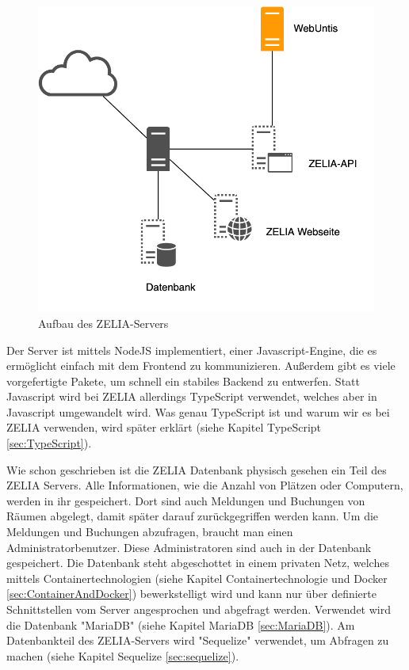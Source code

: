 \begin{figure}[H]
    \centering
    \includegraphics[width=120mm]{./media/Intro/server_arch.png}
    \caption{Aufbau des ZELIA-Servers}
\end{figure}

Der Server ist mittels NodeJS implementiert, einer Javascript-Engine, die es ermöglicht einfach mit dem Frontend zu kommunizieren. Außerdem gibt es viele vorgefertigte Pakete, um schnell ein stabiles Backend zu entwerfen. Statt Javascript wird bei ZELIA allerdings TypeScript verwendet, welches aber in Javascript umgewandelt wird. Was genau TypeScript ist und warum wir es bei ZELIA verwenden, wird später erklärt (siehe Kapitel TypeScript \ref{sec:TypeScript}).


Wie schon geschrieben ist die ZELIA Datenbank physisch gesehen ein Teil des ZELIA Servers. Alle Informationen, wie die Anzahl von Plätzen oder Computern, werden in ihr gespeichert. Dort sind auch Meldungen und Buchungen von Räumen abgelegt, damit später darauf zurückgegriffen werden kann. Um die Meldungen und Buchungen abzufragen, braucht man einen Administratorbenutzer. Diese Administratoren sind auch in der Datenbank gespeichert. Die Datenbank steht abgeschottet in einem privaten Netz, welches mittels Containertechnologien (siehe Kapitel Containertechnologie und Docker \ref{sec:ContainerAndDocker}) bewerkstelligt wird und kann nur über definierte Schnittstellen vom Server angesprochen und abgefragt werden. Verwendet wird die Datenbank "MariaDB" (siehe Kapitel MariaDB \ref{sec:MariaDB}). Am Datenbankteil des ZELIA-Servers wird "Sequelize" verwendet, um Abfragen zu machen (siehe Kapitel Sequelize \ref{sec:sequelize}).


